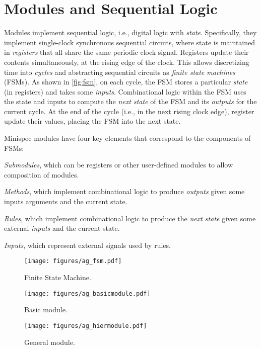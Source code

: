 \section{Modules and Sequential Logic}
\label{sec:modules}

Modules implement sequential logic, i.e., digital logic with \emph{state}.
Specifically, they implement single-clock synchronous sequential circuits,
where state is maintained in \emph{registers} that all share the same periodic clock signal.
Registers update their contents simultaneously, at the rising edge of the clock.
This allows discretizing time into \emph{cycles} and abstracting sequential circuits
as \emph{finite state machines} (FSMs).
As shown in \autoref{fig:fsm}, on each cycle, the FSM stores a particular \emph{state} (in registers)
and takes some \emph{inputs}.
Combinational logic within the FSM uses the state and inputs to compute the
\emph{next state} of the FSM and its \emph{outputs} for the current cycle.
At the end of the cycle (i.e., in the next rising clock edge),
register update their values, placing the FSM into the next state.

Minispec modules have four key elements that correspond to the components of FSMs:
\begin{compactenum}
\item \emph{Submodules}, which can be registers or other user-defined modules to allow composition of modules.
\item \emph{Methods}, which implement combinational logic to produce \emph{outputs} given some inputs arguments and the current state.
\item \emph{Rules}, which implement combinational logic to produce the \emph{next state} given some external \emph{inputs} and the current state.
\item \emph{Inputs}, which represent external signals used by rules.
\end{compactenum}

\begin{figure}[h]
\centering
\begin{minipage}[b]{0.32\columnwidth}
\centering
\texttt{[image: figures/ag\_fsm.pdf]}
\caption{Finite State Machine.}
\label{fig:fsm}
\end{minipage}
\hfill
\begin{minipage}[b]{0.32\columnwidth}
\centering
\texttt{[image: figures/ag\_basicmodule.pdf]}
\caption{Basic module.}
\label{fig:basicmodule}
\end{minipage}
\hfill
\begin{minipage}[b]{0.32\columnwidth}
\centering
\texttt{[image: figures/ag\_hiermodule.pdf]}
\caption{General module.}
\label{fig:hiermodule}
\end{minipage}
\end{figure}



